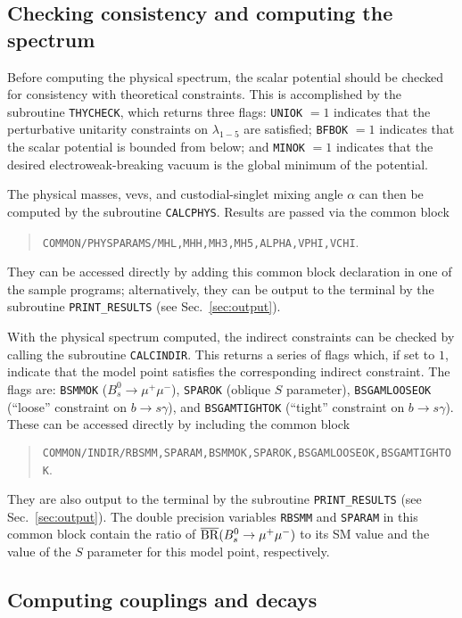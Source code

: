 \documentclass[11pt]{article}
\begin{document}
\subsection{Checking consistency and computing the spectrum}

Before computing the physical spectrum, the scalar potential should be checked for consistency with theoretical constraints.  This is accomplished by the subroutine {\tt THYCHECK}, which returns three flags: {\tt UNIOK} $= 1$ indicates that the perturbative unitarity constraints on $\lambda_{1-5}$ are satisfied; {\tt BFBOK} $= 1$ indicates that the scalar potential is bounded from below; and {\tt MINOK} $= 1$ indicates that the desired electroweak-breaking vacuum is the global minimum of the potential.

The physical masses, vevs, and custodial-singlet mixing angle $\alpha$ can then be computed by the subroutine {\tt CALCPHYS}.  Results are passed via the common block
\begin{quote}
	{\tt COMMON/PHYSPARAMS/MHL,MHH,MH3,MH5,ALPHA,VPHI,VCHI}.
\end{quote}
They can be accessed directly by adding this common block declaration in one of the sample programs; alternatively, they can be output to the terminal by the subroutine {\tt PRINT\_RESULTS} (see Sec.~\ref{sec:output}).

With the physical spectrum computed, the indirect constraints can be checked by calling the subroutine {\tt CALCINDIR}.  This returns a series of flags which, if set to $1$, indicate that the model point satisfies the corresponding indirect constraint.  The flags are: {\tt BSMMOK} ($B_s^0 \to \mu^+\mu^-$), {\tt SPAROK} (oblique $S$ parameter), {\tt BSGAMLOOSEOK} (``loose'' constraint on $b \to s \gamma$), and {\tt BSGAMTIGHTOK} (``tight'' constraint on $b \to s \gamma$).  These can be accessed directly by including the common block
\begin{quote}
      {\tt COMMON/INDIR/RBSMM,SPARAM,BSMMOK,SPAROK,BSGAMLOOSEOK,BSGAMTIGHTOK}.
\end{quote}
They are also output to the terminal by the subroutine {\tt PRINT\_RESULTS} (see Sec.~\ref{sec:output}).  The double precision variables {\tt RBSMM} and {\tt SPARAM} in this common block contain the ratio of $\overline {\rm BR}(B_s^0 \to \mu^+\mu^-)$ to its SM value and the value of the $S$ parameter for this model point, respectively.

\subsection{Computing couplings and decays}
\end{document}
